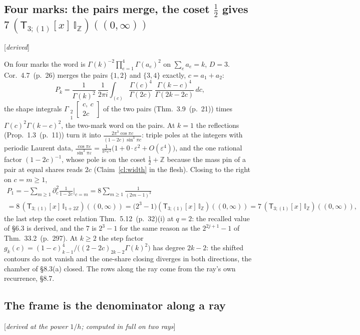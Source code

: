 \documentclass[11pt]{article}
\newcommand{\sT}{\mathsf T}
\newcommand{\Gst}[4]{\Gamma_{\substack{#1\\#2}}\!\begin{bmatrix}#3\\#4\end{bmatrix}}
\newcommand{\IZ}{\mathbb I_{\mathbb Z}}
\newcommand{\Ilat}[1]{\mathbb I_{#1}}
\newcommand{\Tx}[3]{(\sT_{#1;(1)}[x]\,#2)((#3,\infty))}
\newcommand{\status}[1]{\hfill{\small[\textit{#1}]}}
\newcommand{\hb}[2]{#1~(p.~#2)}   %
\theoremstyle{plain}
\theoremstyle{remark}
\begin{document}
\subsection{Four marks: the pairs merge, the coset $\frac12$ gives $7\,\Tx3{\IZ}0$}\status{derived}

On four marks the word is $\Gamma(k)^{-2}\prod_{e=1}^4\Gamma(a_e)^2$ on $\sum_ea_e=k$, $D=3$. Cor.~\hb{4.7}{26} merges the pairs $\{1,2\}$ and $\{3,4\}$ exactly, $c=a_1+a_2$:
\[
P_k=\frac1{\Gamma(k)^2}\ \frac1{2\pi i}\int_{(c)}\frac{\Gamma(c)^4}{\Gamma(2c)}\ \frac{\Gamma(k-c)^4}{\Gamma(2k-2c)}\,dc,
\]
the shape integrals $\Gst21{c,\ c}{2c}$ of the two pairs (Thm.~\hb{3.9}{21}) times $\Gamma(c)^2\Gamma(k-c)^2$, the two-mark word on the pairs. At $k=1$ the reflections (Prop.~\hb{1.3}{11}) turn it into $\frac{2\pi^3\cos\pi c}{(1-2c)\sin^3\pi c}$: triple poles at the integers with periodic Laurent data, $\frac{\cos\pi\varepsilon}{\sin^3\pi\varepsilon}=\frac1{\pi^3\varepsilon^3}\big(1+0\cdot\varepsilon^2+O(\varepsilon^4)\big)$, and the one rational factor $(1-2c)^{-1}$, whose pole is on the coset $\frac12+\mathbb Z$ because the mass pin of a pair at equal shares reads $2c$ (Claim~\ref{cl:width} in the flesh). Closing to the right on $c=m\ge1$,
\begin{multline*}
P_1=-\sum_{m\ge1}\partial_c^2\frac{1}{1-2c}\Big|_{c=m}=8\sum_{m\ge1}\frac1{(2m-1)^3}\\
=8\,\Tx{3}{\Ilat{1+2\mathbb Z}}{0}=\big(2^3-1\big)\Tx{3}{\IZ}{0}=7\,\Tx3{\IZ}0,
\end{multline*}
the last step the coset relation Thm.~\hb{5.12}{32}(i) at $q=2$: the recalled value of \S6.3 is derived, and the $7$ is $2^3-1$ for the same reason as the $2^{2j+1}-1$ of Thm.~\hb{33.2}{297}. At $k\ge2$ the step factor $g_k(c)=(1-c)_{k-1}^4\big/\big((2-2c)_{2k-2}\Gamma(k)^2\big)$ has degree $2k-2$: the shifted contours do not vanish and the one-share closing diverges in both directions, the chamber of \S8.3(a) closed. The rows along the ray come from the ray's own recurrence, \S8.7.

\subsection{The frame is the denominator along a ray}\status{derived at the power $1/h$; computed in full on two rays}
\end{document}
